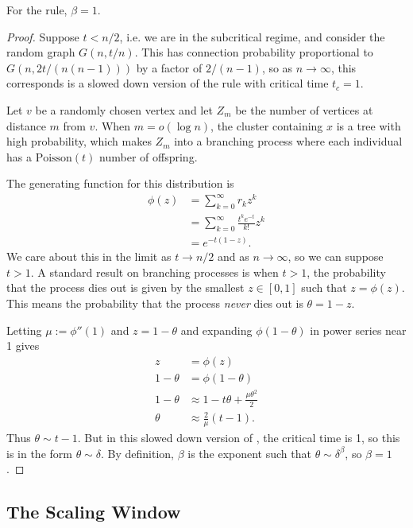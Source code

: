 \documentclass[twoside,10pt]{article}
\newcommand{\poisson}{\text{Poisson}}
\begin{document}
\begin{thrm}[]
	\label{beta1}
	For the \ER rule, $\beta=1$.
\end{thrm}
\begin{proof}
	Suppose $t<n/2$, i.e. we are in the subcritical regime, and consider the \ER random graph $G(n,t/n)$. This has connection probability proportional to $G(n, 2t/(n (n-1)))$ by a factor of $2/(n-1)$, so as $n\to \infty$, this corresponds is a slowed down version of the \ER rule with critical time $t_{c}=1$.

	Let $v$ be a randomly chosen vertex and let $Z_{m}$ be the number of vertices at distance $m$ from $v$. When $m=o(\log n)$, the cluster containing $x$ is a tree with high probability, which makes $Z_{m}$ into a branching process where each individual has a $\poisson(t)$ number of offspring.

	The generating function for this distribution is
	\begin{align*}
		\phi(z) &= \sum_{k=0}^{\infty} r_{k}z^{k} \\
			&= \sum_{k=0}^{\infty} \frac{t^{k} e^{-t}}{k!} z^{k} \\
			&= e^{-t(1-z)}.
	\end{align*}
	We care about this in the limit as $t\to n/2$ and as $n\to \infty$, so we can suppose $t>1$. A standard result on branching processes is when $t>1$, the probability that the process dies out is given by the smallest $z \in [0,1]$ such that $z = \phi(z)$. This means the probability that the process \textit{never} dies out is $\theta = 1-z$.

	Letting $\mu := \phi''(1)$ and $z=1-\theta$ and expanding $\phi(1-\theta)$ in power series near 1 gives
	\begin{align*}
		z &= \phi(z) \\
		1-\theta &= \phi(1-\theta) \\
		1-\theta &\approx 1-t\theta + \frac{\mu\theta^{2}}{2} \\
		\theta &\approx \frac{2}{\mu} (t-1).
	\end{align*}
	Thus $\theta \sim t-1$. But in this slowed down version of \ER, the critical time is 1, so this is in the form $\theta \sim \delta$. By definition, $\beta$ is the exponent such that $\theta \sim \delta^{\beta}$, so $\beta=1$.
\end{proof}

\subsection{The Scaling Window}
\end{document}
